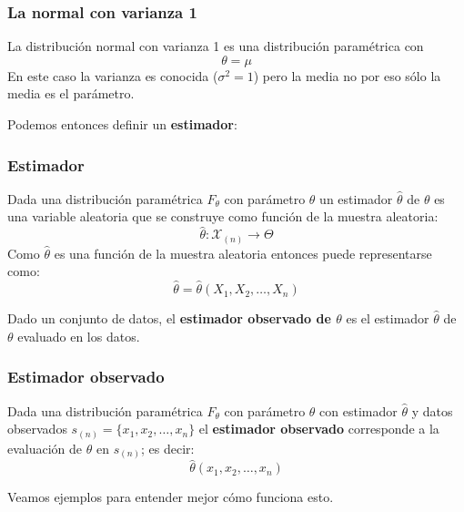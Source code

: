 \documentclass[
]{book}
\newenvironment{Ejemplo}
{\begin{mdframed}[
  linecolor=ejemplocolor,
  skipabove=12pt,
  skipbelow=12pt,
  roundcorner=20pt,
  splittopskip=2\topsep]}
{\end{mdframed}}
\newenvironment{Definicion}
{\begin{mdframed}[
  linecolor=definicioncolor,
  skipabove=12pt,
  skipbelow=12pt,
  roundcorner=20pt,
  splittopskip=2\topsep]}
{\end{mdframed}}
\begin{document}
\begin{Ejemplo}
\hypertarget{la-normal-con-varianza-1}{%
\subsubsection{La normal con varianza
1}\label{la-normal-con-varianza-1}}

La distribución normal con varianza 1 es una distribución paramétrica
con \[
\theta = \mu
\] En este caso la varianza es conocida (\(\sigma^2 = 1\)) pero la media
no por eso sólo la media es el parámetro.
\end{Ejemplo}

Podemos entonces definir un \textbf{estimador}:

\begin{Definicion}
\hypertarget{estimador}{%
\subsubsection{Estimador}\label{estimador}}

Dada una distribución paramétrica \(F_{\theta}\) con parámetro
\(\theta\) un estimador \(\hat{\theta}\) de \(\theta\) es una variable
aleatoria que se construye como función de la muestra aleatoria: \[
\hat{\theta}: \mathcal{X}_{(n)} \to \Theta
\] Como \(\hat{\theta}\) es una función de la muestra aleatoria entonces
puede representarse como: \[
\hat{\theta} = \hat{\theta}(X_1, X_2, \dots, X_n)
\]
\end{Definicion}

Dado un conjunto de datos, el \textbf{estimador observado de \(\theta\)} es el estimador \(\hat{\theta}\) de \(\theta\) evaluado en los datos.

\begin{Definicion}
\hypertarget{estimador-observado}{%
\subsubsection{Estimador observado}\label{estimador-observado}}

Dada una distribución paramétrica \(F_{\theta}\) con parámetro
\(\theta\) con estimador \(\hat{\theta}\) y datos observados
\(s_{(n)} = \{x_1, x_2, \dots, x_n\}\) el \textbf{estimador observado}
corresponde a la evaluación de \(\hat{\theta}\) en \(s_{(n)}\); es
decir: \[
\hat{\theta}(x_1, x_2, \dots, x_n)
\]
\end{Definicion}

Veamos ejemplos para entender mejor cómo funciona esto.
\end{document}
